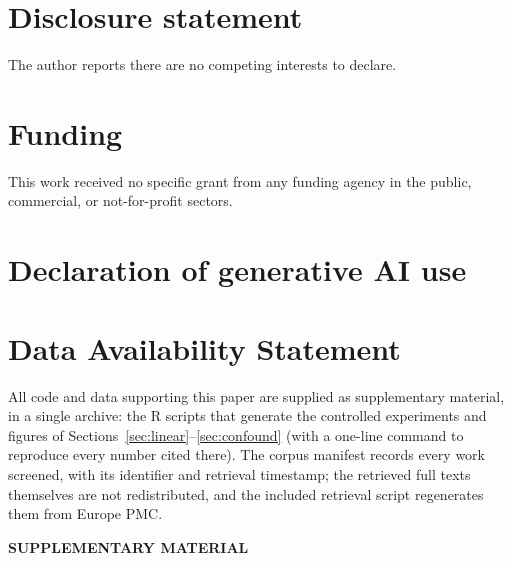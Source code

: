 \documentclass[12pt]{article}
\begin{document}
\section{Disclosure statement}
\label{disclosure-statement}

The author reports there are no competing interests to declare.

\section{Funding}
\label{funding}

This work received no specific grant from any funding agency in the public,
commercial, or not-for-profit sectors.

\section{Declaration of generative AI use}
\label{genai-statement}



\section{Data Availability Statement}
\label{sec:availability}

All code and data supporting this paper are supplied as supplementary
material, in a single archive: the R scripts that generate the controlled
experiments and figures of Sections~\ref{sec:linear}--\ref{sec:confound} (with
a one-line command to reproduce every number cited there). The corpus manifest
records every work screened, with its identifier and retrieval timestamp; the
retrieved full texts themselves are not redistributed, and the included
retrieval script regenerates them from Europe PMC.

\label{supplementary-material}
\bigskip

\begin{center}

{\large\bf SUPPLEMENTARY MATERIAL}

\end{center}
\end{document}

